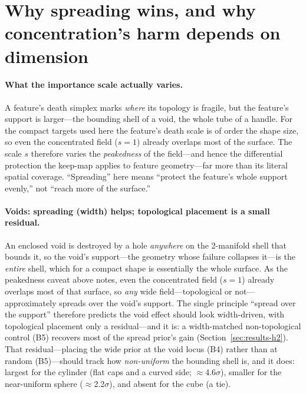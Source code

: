\section{Why spreading wins, and why concentration's harm depends on dimension}
\label{sec:mechanism}

\paragraph{What the importance scale actually varies.}
A feature's death simplex marks \emph{where} its topology is fragile, but the
feature's support is larger---the bounding shell of a void, the whole tube of a
handle. For the compact targets used here the feature's death scale is of order the
shape size, so even the concentrated field ($s{=}1$) already overlaps most of the
surface. The scale $s$ therefore varies the \emph{peakedness} of the field---and
hence the differential protection the keep-map applies to feature geometry---far
more than its literal spatial coverage. ``Spreading'' here means ``protect the
feature's whole support evenly,'' not ``reach more of the surface.''

\paragraph{Voids: spreading (width) helps; topological placement is a small residual.}
An enclosed void is destroyed by a hole \emph{anywhere} on the 2-manifold shell that
bounds it, so the void's support---the geometry whose failure collapses it---is the
\emph{entire} shell, which for a compact shape is essentially the whole surface. As the
peakedness caveat above notes, even the concentrated field ($s{=}1$) already overlaps
most of that surface, so \emph{any} wide field---topological or not---approximately
spreads over the void's support. The single principle ``spread over the support''
therefore predicts the void effect should look width-driven, with topological placement
only a residual---and it is: a width-matched non-topological control (B5) recovers most
of the spread prior's gain (Section~\ref{sec:results-h2}). That residual---placing the
wide prior at the void locus (B4) rather than at random (B5)---should track how
\emph{non-uniform} the bounding shell is, and it does: largest for the cylinder (flat
caps and a curved side; $\approx$4.6$\sigma$), smaller for the near-uniform sphere
($\approx$2.2$\sigma$), and absent for the cube (a tie).

